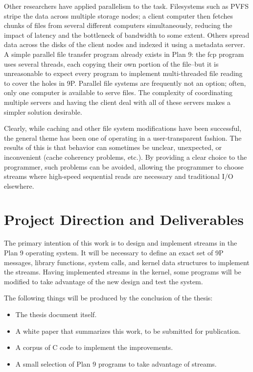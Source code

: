 \documentclass[12pt,american]{report}
\begin{document}
Other researchers have applied parallelism to the task.\cite{Lee01appliedtechniques}\cite{PVFS} Filesystems such as PVFS stripe the data across multiple storage nodes; a client computer then fetches chunks of files from several different computers simultaneously, reducing the impact of latency and the bottleneck of bandwidth to some extent. Others\cite{NFSP} spread data across the disks of the client nodes and indexed it using a metadata server. A simple parallel file transfer program already exists in Plan 9: the fcp program uses several threads, each copying their own portion of the file--but it is unreasonable to expect every program to implement multi-threaded file reading to cover the holes in 9P. Parallel file systems are frequently not an option; often, only one computer is available to serve files. The complexity of coordinating multiple servers and having the client deal with all of these servers makes a simpler solution desirable.

Clearly, while caching and other file system modifications have been successful, the general theme has been one of operating in a user-transparent fashion. The results of this is that behavior can sometimes be unclear, unexpected, or inconvenient (cache coherency problems, etc.). By providing a clear choice to the programmer, such problems can be avoided, allowing the programmer to choose streams where high-speed sequential reads are necessary and traditional I/O elsewhere.

\section{Project Direction and Deliverables}
The primary intention of this work is to design and implement streams in the Plan 9 operating system. It will be necessary to define an exact set of 9P messages, library functions, system calls, and kernel data structures to implement the streams. Having implemented streams in the kernel, some programs will be modified to take advantage of the new design and test the system.


The following things will be produced by the conclusion of the thesis:
\begin{itemize}
\item The thesis document itself.
\item A white paper that summarizes this work, to be submitted for publication.
\item A corpus of C code to implement the improvements.
\item A small selection of Plan 9 programs to take advantage of streams.
\end{itemize}
\end{document}
